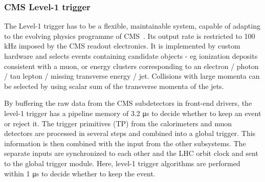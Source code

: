 \subsubsection*{CMS Level-1 trigger}
The Level-1 trigger has to be a flexible, maintainable system, capable of adapting to the evolving physics programme of CMS~\cite{Khachatryan:2016bia}. Its output rate is restricted to 100 \si{ \kilo \hertz} imposed by the CMS readout electronics. It is implemented by custom hardware and selects events containing candidate objects - eg ionization deposits consistent with a muon, or energy clusters corresponding to an electron / photon / tau lepton / missing transverse energy / jet. Collisions with large momenta can be selected by using scalar sum of the transverse momenta of the jets. 

By buffering the raw data from the CMS subdetectors in front-end drivers, the level-1 trigger has a pipeline memory of 3.2 \si{ \micro \second} to decide whether to keep an event or reject it. 
The trigger primitives (TP) from the calorimeters and muon detectors are processed in several steps and combined into a global trigger. This information is then combined with the input from the other subsystems. The separate inputs are synchronized to each other and the LHC orbit clock and sent to the global trigger module. Here, level-1 trigger algorithms are performed within 1 \si{ \micro \second} to decide whether to  keep the event. 

